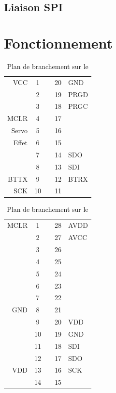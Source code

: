 	
			\subsection{Liaison SPI}
		\section{Fonctionnement}
		\begin{table}
			\begin{center}
				\begin{tabular}{r|ccc|l}
	
				VCC		& 1 &   & 20 & GND \\ 
				  		& 2 &   & 19 & PRGD \\ 
				 		& 3 &   & 18 & PRGC \\ 
				MCLR 	& 4 &   & 17 &  \\ 
				Servo 	& 5 &   & 16 &   \\
				 Effet	& 6 &   & 15 &   \\ 
				  		& 7 &   & 14 & SDO \\ 
				  		& 8 &   & 13 & SDI \\ 
				BTTX 	& 9 &   & 12 & BTRX \\ 
				SCK 	& 10&   & 11 &   \\ 
				\end{tabular} 
			\end{center}
			\caption{Plan de branchement sur le \pic}
			\label{pinoutpic}
		\end{table}
		\begin{table}
			\begin{center}
				\begin{tabular}{r|ccc|l}
				MCLR & 1 &   & 28 & AVDD \\ 
				  & 2 &   & 27 & AVCC \\ 
				  & 3 &   & 26 &   \\ 
				  & 4 &   & 25 &   \\ 
				  & 5 &   & 24 &   \\ 
				  & 6 &   & 23 &   \\ 
				 & 7 &   & 22 &   \\ 
				GND & 8 &   & 21 &   \\ 
				  & 9 &   & 20 & VDD \\ 
				  & 10 &   & 19 & GND \\ 
				  & 11 &   & 18 & SDI \\ 
				  & 12 &   & 17 & SDO \\ 
				VDD & 13 &   & 16 & SCK \\ 
				  & 14 &   & 15 &   \\ 
				\end{tabular} 
			\end{center}
			\caption{Plan de branchement sur le \dspic}
			\label{pinoutdspic}
		\end{table}
